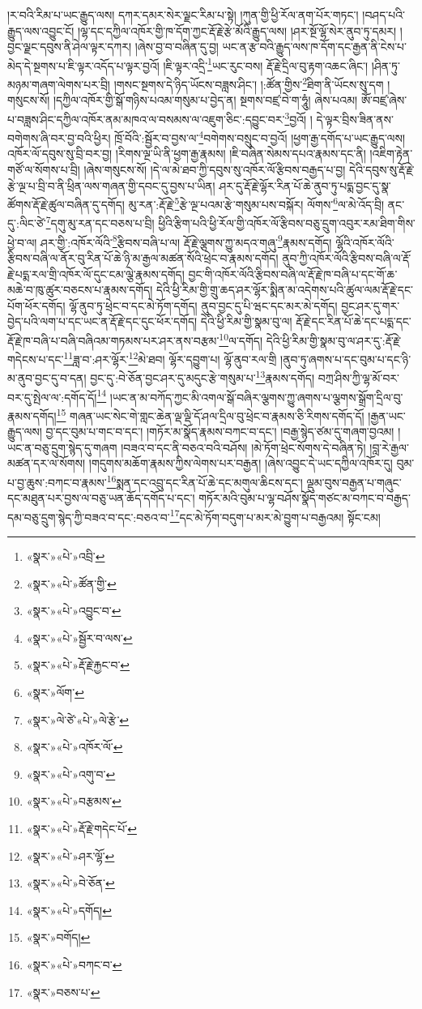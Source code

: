 །ར་བའི་རིམ་པ་ཡང་རྒྱུད་ལས། དཀར་དམར་སེར་ལྗང་རིམ་པ་སྟེ། །ཀུན་གྱི་ཕྱི་རོལ་ནག་པོར་གཏང་། །བཤད་པའི་རྒྱུད་ལས་འབྱུང་ངོ། །ལྷ་དང་དཀྱིལ་འཁོར་གྱི་ཁ་དོག་ཀྱང་རྡོ་རྗེ་རྩེ་མོའི་རྒྱུད་ལས། །ཤར་སྔོ་ལྷོ་སེར་ནུབ་ཏུ་དམར། །བྱང་ལྗང་དབུས་ནི་ཤེལ་ལྟར་དཀར། །ཞེས་བྱ་བ་བཞིན་དུ་བྱ། ཡང་ན་རྩ་བའི་རྒྱུད་ལས་ཁ་དོག་དང་རྒྱན་ནི་ངེས་པ་མེད་དེ་སྔགས་པ་ཇི་ལྟར་འདོད་པ་ལྟར་བྱའོ། །ཇི་ལྟར་འདྲི་\footnote{«སྣར་»«པེ་»འབྲི་}ཡང་རུང་བས། རྡོ་རྗེ་དྲིལ་བུ་རྟག་འཆང་ཞིང་། །ཤིན་ཏུ་མཉམ་གཞག་ལེགས་པར་བྲི། །གསང་སྔགས་དེ་ཉིད་ཡོངས་བཟླས་ཤིང་། །:ཚོན་གྱིས་\footnote{«སྣར་»«པེ་»ཚོན་གྱི་}ཐིག་ནི་ཡོངས་སུ་དག །གསུངས་སོ། །དཀྱིལ་འཁོར་གྱི་སྒོ་གཉིས་པའམ་གསུམ་པ་བྱེད་ན། སྔགས་བཛྲ་བེ་ག་ཧཱུཾ། ཞེས་པའམ། ཨོཾ་བཛྲ་ཞེས་པ་བཟླས་ཤིང་དཀྱིལ་འཁོར་ནམ་མཁའ་ལ་བསམས་ལ་འཇུག་ཅིང་:དབྱུང་བར་\footnote{«སྣར་»«པེ་»འབྱུང་བ་}བྱའོ། །
དེ་ལྟར་བྲིས་ཟིན་ནས་བགེགས་ཞི་བར་བྱ་བའི་ཕྱིར། ཁྲོ་བོའི་:སྦྱོར་བ་བྱས་ལ་\footnote{«སྣར་»«པེ་»སྦྱོར་བ་ལས་}བགེགས་བསྲུང་བ་བྱའོ། །ཕྱག་རྒྱ་དགོད་པ་ཡང་རྒྱུད་ལས། འཁོར་ལོ་དབུས་སུ་བྲི་བར་བྱ། །རིགས་ལྔ་ཡི་ནི་ཕྱག་རྒྱ་རྣམས། །ཇི་བཞིན་སེམས་དཔའ་རྣམས་དང་ནི། །འཇིག་རྟེན་གཙོ་ལ་སོགས་པ་བྲི། །ཞེས་གསུངས་སོ། །དེ་ལ་མེ་ཐབ་ཀྱི་དབུས་སུ་འཁོར་ལོ་རྩིབས་བརྒྱད་པ་བྱ། དེའི་དབུས་སུ་རྡོ་རྗེ་རྩེ་ལྔ་པ་བྲི་བ་ནི་ཕྲིན་ལས་གཞན་གྱི་དབང་དུ་བྱས་པ་ཡིན། ཤར་དུ་རྡོ་རྗེ་ལྷོར་རིན་པོ་ཆེ་ནུབ་ཏུ་པདྨ་བྱང་དུ་སྣ་ཚོགས་རྡོ་རྗེ་ཚུལ་བཞིན་དུ་དགོད། མུ་རན་:རྡོ་རྗེ་\footnote{«སྣར་»«པེ་»རྡོ་རྗེ་རྐྱང་བ་}རྩེ་ལྔ་པའམ་རྩེ་གསུམ་པས་བསྐོར། ལོགས་\footnote{«སྣར་»ལོག་}ལ་མེ་འོད་བྲི། ནང་དུ་:ལིང་ཙེ་\footnote{«སྣར་»ལེ་ཙེ་«པེ་»ལེ་རྩེ་}དགུ་མུ་རན་དང་བཅས་པ་བྲི། ཕྱིའི་རྩིག་པའི་ཕྱི་རོལ་གྱི་འཁོར་ལོ་རྩིབས་བཅུ་དྲུག་འབུར་རམ་ཐིག་གིས་ཕྱེ་བ་ལ། ཤར་གྱི་:འཁོར་ལོའི་\footnote{«སྣར་»«པེ་»འཁོར་ལོ་}རྩིབས་བཞི་པ་ལ། རྡོ་རྗེ་ལྕགས་ཀྱུ་མདའ་གཞུ་\footnote{«སྣར་»«པེ་»འགུ་བ་}རྣམས་དགོད། ལྷོའི་འཁོར་ལོའི་རྩིབས་བཞི་ལ་ནོར་བུ་རིན་པོ་ཆེ་ཉི་མ་རྒྱལ་མཚན་སོའི་ཕྲེང་བ་རྣམས་དགོད། ནུབ་ཀྱི་འཁོར་ལོའི་རྩིབས་བཞི་ལ་རྡོ་རྗེ་པདྨ་རལ་གྲི་འཁོར་ལོ་དུང་ངམ་ལྕེ་རྣམས་དགོད། བྱང་གི་འཁོར་ལོའི་རྩིབས་བཞི་ལ་རྡོ་རྗེ་ཁ་བཞི་པ་དང་གོ་ཆ་མཆེ་བ་ཁུ་ཚུར་བཅངས་པ་རྣམས་དགོད། དེའི་ཕྱི་རིམ་གྱི་གྲུ་ཆད་ཤར་ལྷོར་སྨིན་མ་འདེགས་པའི་ཚུལ་ལམ་རྡོ་རྗེ་དང་པོག་ཕོར་དགོད། ལྷོ་ནུབ་ཏུ་ཕྲེང་བ་དང་མེ་ཏོག་དགོད། ནུབ་བྱང་དུ་པི་ཝང་དང་མར་མེ་དགོད། བྱང་ཤར་དུ་གར་བྱེད་པའི་ལག་པ་དང་ཡང་ན་རྡོ་རྗེ་དང་དུང་ཕོར་དགོད། དེའི་ཕྱི་རིམ་གྱི་སྣམ་བུ་ལ། རྡོ་རྗེ་དང་རིན་པོ་ཆེ་དང་པདྨ་དང་རྡོ་རྗེ་ཁ་བཞི་པ་བཞི་བཞིའམ་གཏམས་པར་ཤར་ནས་བརྩམ་\footnote{«སྣར་»«པེ་»བརྩམས་}ལ་དགོད། དེའི་ཕྱི་རིམ་གྱི་སྣམ་བུ་ལ་ཤར་དུ་:རྡོ་རྗེ་གདེངས་པ་དང་\footnote{«སྣར་»«པེ་»རྡོ་རྗེ་གདེང་པོ་}ཟླ་བ་:ཤར་ལྷོར་\footnote{«སྣར་»«པེ་»ཤར་ལྷོ་}མེ་ཐབ། ལྷོར་དབྱུག་པ། ལྷོ་ནུབ་རལ་གྲི །ནུབ་ཏུ་ཞགས་པ་དང་བུམ་པ་དང་ཉི་མ་ནུབ་བྱང་དུ་བ་དན། བྱང་དུ་:བེ་ཅོན་བྱང་ཤར་དུ་མདུང་རྩེ་གསུམ་པ་\footnote{«སྣར་»«པེ་»བེ་ཅོན་}རྣམས་དགོད། བཀྲ་ཤིས་ཀྱི་ལྷ་མོ་བར་བར་དུ་སྤེལ་ལ་:དགོད་དོ།\footnote{«སྣར་»«པེ་»དགོད།} །ཡང་ན་མ་བཀོད་ཀྱང་མི་འགལ་སྒོ་བཞིར་ལྕགས་ཀྱུ་ཞགས་པ་ལྕགས་སྒྲོག་དྲིལ་བུ་རྣམས་དགོད།\footnote{«སྣར་»བགོད།} གཞན་ཡང་སེང་གེ་གླང་ཆེན་ལྡ་ལྡི་དོ་ཤལ་དྲིལ་བུ་ཕྲེང་བ་རྣམས་ཅི་རིགས་དགོད་དོ། །རྒྱན་ཡང་རྒྱུད་ལས། བྱ་དང་བུམ་པ་གང་བ་དང་། །གཏོར་མ་སྣོད་རྣམས་བཀང་བ་དང་། །བརྒྱ་སྙེད་ཙམ་དུ་གཞག་བྱའམ། །ཡང་ན་བཅུ་དྲུག་སྙེད་དུ་གཞག །བཟའ་བ་དང་ནི་བཅའ་བའི་བཤོས། །མེ་ཏོག་ཕྲེང་སོགས་དེ་བཞིན་ཏེ། །བླ་རེ་རྒྱལ་མཚན་དར་ལ་སོགས། །གདུགས་མཆོག་རྣམས་ཀྱིས་ལེགས་པར་བརྒྱན། །ཞེས་འབྱུང་དེ་ཡང་དཀྱིལ་འཁོར་དུ། བུམ་པ་བྱ་ཆུས་:བཀང་བ་རྣམས་\footnote{«སྣར་»«པེ་»བཀང་བ་}སྨན་དང་འབྲུ་དང་རིན་པོ་ཆེ་དང་མགུལ་ཆིངས་དང་། ལྡུམ་བུས་བརྒྱན་པ་གཞུང་དང་མཐུན་པར་བྱས་ལ་བཅུ་ཡན་ཆོད་དགོད་པ་དང་། གཏོར་མའི་བུམ་པ་ལྷ་བཤོས་སྣོད་གཙང་མ་བཀང་བ་བརྒྱད་དམ་བཅུ་དྲུག་སྙེད་ཀྱི་བཟའ་བ་དང་:བཅའ་བ་\footnote{«སྣར་»བཅས་པ་}དང་མེ་ཏོག་བདུག་པ་མར་མེ་བྱུག་པ་བརྒྱའམ། སྟོང་ངམ། 